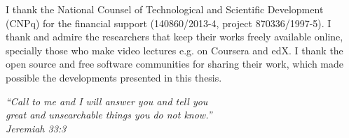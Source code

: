 \documentclass[
12pt,		%
openright,	%
twoside,  %
a4paper,			%
chapter=TITLE,		%
english,			%
french,				%
spanish,			%
brazil				%
]{USPSC}
\begin{document}
\begin{agradecimentos}
I thank the National Counsel of Technological and Scientific Development (CNPq)
for the financial support (140860/2013-4, project 870336/1997-5).
I thank and admire the researchers that keep their works freely available online,
specially those who make video lectures e.g. on Coursera and edX.
I thank the open source and free software communities for sharing their work,
which made possible the developments presented in this thesis.
% 
% 
% 
\end{agradecimentos}

\begin{epigrafe}
    \vspace*{\fill}
	\begin{flushright}
		\textit{``Call to me and I will answer you and tell you\\
		great and unsearchable things you do not know.''\\
		Jeremiah 33:3}
	\end{flushright}
\end{epigrafe}
\end{document}
